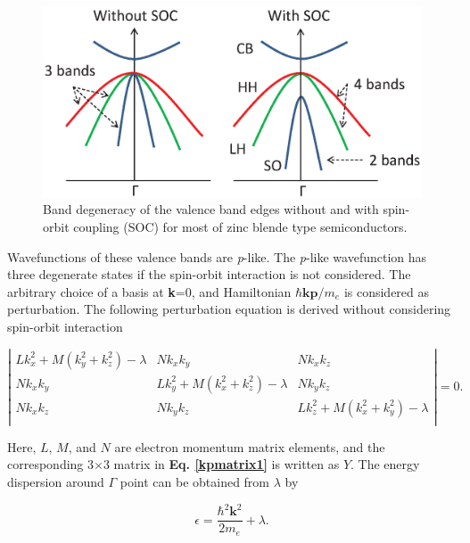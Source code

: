 \documentclass[a4paper, 12pt, titlepage,oneside,drop]{kthesis}
\begin{document}
\begin{figure}[H]
\centering
\includegraphics[scale=0.8]{bands.eps} 
\caption{Band degeneracy of the valence band edges without and with spin-orbit coupling (SOC) for most of zinc blende type semiconductors.}
\label{device}
\end{figure}


Wavefunctions of these valence bands are \textit{p}-like. The \textit{p}-like wavefunction has three degenerate states if the spin-orbit interaction is not considered. The arbitrary choice of a basis at \textbf{k}=0,
and Hamiltonian $\hbar\textbf{kp}/m_e$ is considered as perturbation. The following perturbation equation is derived without considering spin-orbit interaction

\begin{equation}\label{kpmatrix1}
\left|
\begin{matrix}
   Lk_x^2+M(k_y^2+k_z^2)-\lambda & Nk_xk_y                       & Nk_xk_z \\
   Nk_xk_y                       & Lk_y^2+M(k_x^2+k_z^2)-\lambda & Nk_yk_z\\
   Nk_xk_z                       & Nk_yk_z                       & Lk_z^2+M(k_x^2+k_y^2)-\lambda\\
\end{matrix} \right|
 = 0.
\end{equation}

Here, $L$, $M$, and $N$ are electron momentum matrix elements, and the corresponding 3$\times$3 matrix in \textbf{Eq. \ref{kpmatrix1}} is written as $Y$. The energy dispersion around $\Gamma$ point can be obtained from $\lambda$ by

\begin{equation}
 \epsilon = \frac{\hbar^2\textbf{k}^2}{2m_e}+\lambda.
\end{equation}
\end{document}
